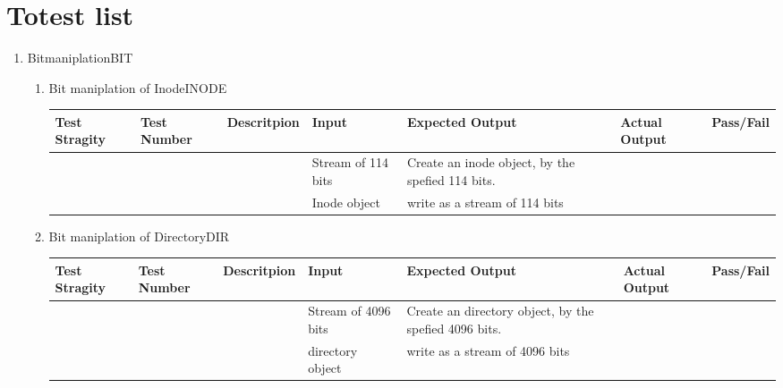 \documentclass{article}
\date{\today}
\title{}
\begin{document}
\tableofcontents

\section{Totest list}
\label{sec:orgd5c2049}
\begin{enumerate}
\item Bitmaniplation\hfill{}\textsc{BIT}
\label{sec:org6adf0fe}
\begin{enumerate}
\item Bit maniplation of Inode\hfill{}\textsc{INODE}
\label{sec:orga93b7a7}
\begin{center}
\begin{tabular}{lllllll}
Test Stragity & Test Number & Descritpion & Input & Expected Output & Actual Output & Pass/Fail\\
\hline
 &  &  & Stream of 114 bits & Create an inode object, by the spefied 114 bits. &  & \\
 &  &  & Inode object & write as a stream of 114 bits &  & \\
\end{tabular}
\end{center}



\item Bit maniplation of Directory\hfill{}\textsc{DIR}
\label{sec:orgf4db9a5}
\begin{center}
\begin{tabular}{lllllll}
Test Stragity & Test Number & Descritpion & Input & Expected Output & Actual Output & Pass/Fail\\
\hline
 &  &  & Stream of 4096 bits & Create an directory object, by the spefied 4096 bits. &  & \\
 &  &  & directory object & write as a stream of 4096 bits &  & \\
\end{tabular}
\end{center}
\end{enumerate}



\end{enumerate}
\end{document}
